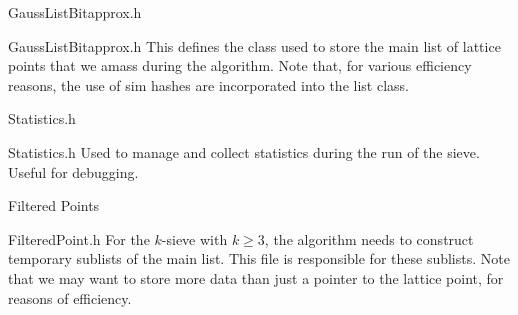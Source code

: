 \documentclass{beamer}
\begin{document}
\begin{frame}{GaussListBitapprox.h}
\begin{block}{GaussListBitapprox.h}
This defines the class used to store the main list of lattice points that we amass during the algorithm.
Note that, for various efficiency reasons, the use of sim hashes are incorporated into the list class.
\end{block}
\end{frame}

\begin{frame}{Statistics.h}
\begin{block}{Statistics.h}
Used to manage and collect statistics during the run of the sieve. Useful for debugging.
\end{block}
\end{frame}

\begin{frame}{Filtered Points}
\begin{block}{FilteredPoint.h}
For the $k$-sieve with $k\geq 3$, the algorithm needs to construct temporary sublists of the main list.
This file is responsible for these sublists. Note that we may want to store more data than just a pointer to the
lattice point, for reasons of efficiency.
\end{block}
\end{frame}
\end{document}
